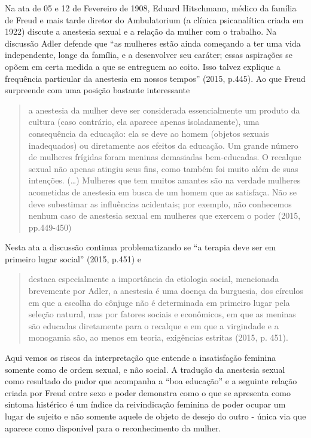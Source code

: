 Na ata de 05 e 12 de Fevereiro de 1908, Eduard Hitschmann, médico da
família de Freud e mais tarde diretor do Ambulatorium (a clínica
psicanalítica criada em 1922) discute a anestesia sexual e a relação da
mulher com o trabalho. Na discussão Adler defende que ``as mulheres
estão ainda começando a ter uma vida independente, longe da família, e a
desenvolver seu caráter; essas aspirações se opõem em certa medida a que
se entreguem ao coito. Isso talvez explique a frequência particular da
anestesia em nossos tempos'' (2015, p.445). Ao que Freud surpreende com
uma posição bastante interessante

\begin{quote}
a anestesia da mulher deve ser considerada essencialmente um produto da
cultura (caso contrário, ela aparece apenas isoladamente), uma
consequência da educação: ela se deve ao homem (objetos sexuais
inadequados) ou diretamente aos efeitos da educação. Um grande número de
mulheres frígidas foram meninas demasiadas bem-educadas. O recalque
sexual não apenas atingiu seus fins, como também foi muito além de suas
intenções. (\ldots{}) Mulheres que tem muitos amantes são na verdade mulheres
acometidas de anestesia em busca de um homem que as satisfaça. Não se
deve subestimar as influências acidentais; por exemplo, não conhecemos
nenhum caso de anestesia sexual em mulheres que exercem o poder (2015,
pp.449-450)
\end{quote}

Nesta ata a discussão continua problematizando se ``a terapia deve ser em
primeiro lugar social'' (2015, p.451) e

\begin{quote}
destaca especialmente a importância da etiologia social, mencionada
brevemente por Adler, a anestesia é uma doença da burguesia, dos
círculos em que a escolha do cônjuge não é determinada em primeiro lugar
pela seleção natural, mas por fatores sociais e econômicos, em que as
meninas são educadas diretamente para o recalque e em que a virgindade e
a monogamia são, ao menos em teoria, exigências estritas (2015, p. 451).
\end{quote}

Aqui vemos os riscos da interpretação que entende a insatisfação
feminina somente como de ordem sexual, e não social. A tradução da
anestesia sexual como resultado do pudor que acompanha a ``boa
educação'' e a seguinte relação criada por Freud entre sexo e poder
demonstra como o que se apresenta como sintoma histérico é um índice da
reivindicação feminina de poder ocupar um lugar de sujeito e não somente
aquele de objeto de desejo do outro - única via que aparece como
disponível para o reconhecimento da mulher.

